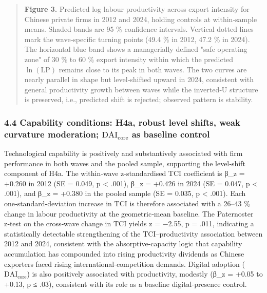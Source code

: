 \documentclass[12pt,a4paper]{article}
\begin{document}
\begin{quote}
\textbf{Figure 3.} Predicted log labour productivity across export
intensity for Chinese private firms in 2012 and 2024, holding controls
at within‑sample means. Shaded bands are 95 \% confidence intervals.
Vertical dotted lines mark the wave‑specific turning points (49.4 \% in
2012, 47.2 \% in 2024). The horizontal blue band shows a managerially
defined "safe operating zone" of 30 \% to 60 \% export intensity within
which the predicted \(\ln(\mathrm{LP})\) remains close to its peak in
both waves. The two curves are nearly parallel in shape but
level‑shifted upward in 2024, consistent with general productivity
growth between waves while the inverted‑U structure is preserved, i.e.,
predicted shift is rejected; observed pattern is stability.
\end{quote}

\hypertarget{44-capability-conditions-h4a-robust-level-shifts-weak-curvature-moderation-mathrmdai_textcore-as-baseline-control}{%
\subsubsection{\texorpdfstring{4.4 Capability conditions: H4a, robust
level shifts, weak curvature moderation; \(\mathrm{DAI}_{\text{core}}\)
as baseline
control}{4.4 Capability conditions: H4a, robust level shifts, weak curvature moderation; \textbackslash mathrm\{DAI\}\_\{\textbackslash text\{core\}\} as baseline control}}\label{44-capability-conditions-h4a-robust-level-shifts-weak-curvature-moderation-mathrmdai_textcore-as-baseline-control}}

Technological capability is positively and substantively associated with
firm performance in both waves and the pooled sample, supporting the
level‑shift component of H4a. The within‑wave z‑standardised TCI
coefficient is β\_z = +0.260 in 2012 (SE = 0.049, p \textless{} .001),
β\_z = +0.426 in 2024 (SE = 0.047, p \textless{} .001), and β\_z =
+0.380 in the pooled sample (SE = 0.035, p \textless{} .001). Each
one‑standard‑deviation increase in TCI is therefore associated with a
26--43 \% change in labour productivity at the geometric‑mean baseline.
The Paternoster z‑test on the cross‑wave change in TCI yields z = −2.55,
p = .011, indicating a statistically detectable strengthening of the
TCI--productivity association between 2012 and 2024, consistent with the
absorptive-capacity logic that capability accumulation has compounded
into rising productivity dividends as Chinese exporters faced rising
international-competition demands. Digital adoption
(\(\mathrm{DAI}_{\text{core}}\)) is also positively associated with
productivity, modestly (β\_z = +0.05 to +0.13, p ≤ .03), consistent with
its role as a baseline digital-presence control.
\end{document}
